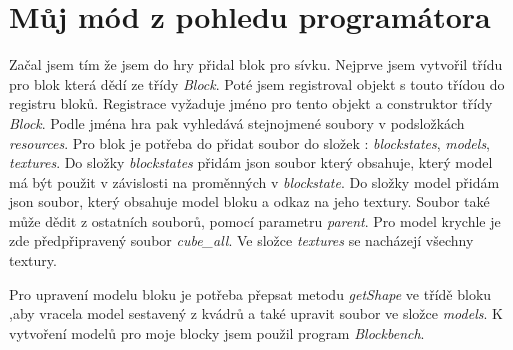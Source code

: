 \documentclass[FM,RP]{tulthesis}
\begin{document}
\chapter{Můj mód z pohledu programátora}
    Začal jsem tím že jsem do hry přidal blok pro sívku. Nejprve jsem vytvořil třídu pro blok která dědí ze třídy  \textit{Block}. Poté jsem  registroval objekt s touto třídou do registru bloků. Registrace vyžaduje jméno pro tento objekt a  construktor třídy \textit{Block}. Podle jména hra pak vyhledává stejnojmené soubory v podsložkách \textit{resources}.  Pro blok je potřeba do přidat soubor do složek : \textit{blockstates}, \textit{models}, \textit{textures}. Do složky \textit{blockstates} přidám json soubor který obsahuje, který model má být použit v závislosti na proměnných v \textit{blockstate}.  Do složky model přidám json soubor, který obsahuje model bloku a odkaz na jeho textury. Soubor také může dědit z ostatních souborů, pomocí parametru \textit{parent}. Pro model krychle je zde předpřipravený soubor \textit{cube_all}. Ve složce \textit{textures} se nacházejí všechny textury.
\begin{comment}
    Tímto jsem přidal do hry blok, ten ale nemá žádné funkce.
\end{comment}

    Pro upravení modelu bloku je potřeba přepsat metodu \textit{getShape} ve třídě bloku ,aby vracela model sestavený z kvádrů a také upravit soubor ve složce \textit{models}. K vytvoření modelů pro moje blocky jsem použil program \textit{Blockbench}.
\end{document}
